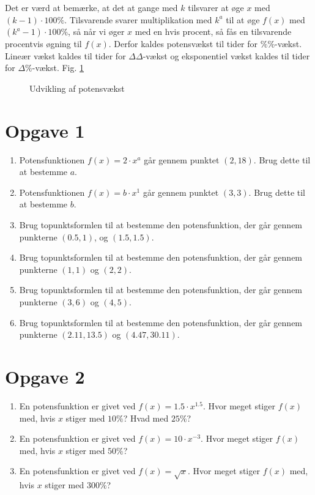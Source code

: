 Det er værd at bemærke, at det at gange med $k$ tilsvarer at øge $x$ med $(k-1)\cdot 100 \%.$ Tilsvarende svarer multiplikation med $k^a$ til at øge $f(x)$ med $(k^a-1)\cdot 100\%$, så når vi øger $x$ med en hvis procent, så fås en tilsvarende procentvis øgning til $f(x)$. Derfor kaldes potensvækst til tider for $\%\%$-vækst. Lineær vækst kaldes til tider for $\Delta\Delta$-vækst og eksponentiel vækst kaldes til tider for $\Delta\%$-vækst. Fig. \ref{fig:potens}
\begin{figure}[H]
\centering
{}
\caption{Udvikling af potensvækst}
\label{fig:potens}
\end{figure}
\section*{Opgave 1}
\begin{enumerate}[label=\roman*)]
\item Potensfunktionen $f(x) = 2\cdot x^a$ går gennem punktet $(2,18)$. Brug dette til at bestemme $a$.
\item Potensfunktionen $f(x) = b\cdot x^1$ går gennem punktet $(3,3)$. Brug dette til at bestemme $b$.
\item Brug topunktsformlen til at bestemme den potensfunktion, der går gennem punkterne $(0.5,1)$, og $(1.5,1.5)$.
\item Brug topunktsformlen til at bestemme den potensfunktion, der går gennem punkterne $(1,1)$ og $(2,2)$.
\item Brug topunktsformlen til at bestemme den potensfunktion, der går gennem punkterne $(3,6)$ og $(4,5)$.
\item Brug topunktsformlen til at bestemme den potensfunktion, der går gennem punkterne $(2.11,13.5)$ og $(4.47,30.11)$.
\end{enumerate}
\section*{Opgave 2}
\begin{enumerate}
\item En potensfunktion er givet ved $f(x) = 1.5\cdot x^{1.5}$. Hvor meget stiger $f(x)$ med, hvis $x$ stiger med $10\%$? Hvad med $25\%$?
\item En potensfunktion er givet ved $f(x) = 10\cdot x^{-3}$. Hvor meget stiger $f(x)$ med, hvis $x$ stiger med $50\%$?
\item En potensfunktion er givet ved $f(x) = \sqrt{x}$. Hvor meget stiger $f(x)$ med, hvis $x$ stiger med $300\%$?
\end{enumerate}
